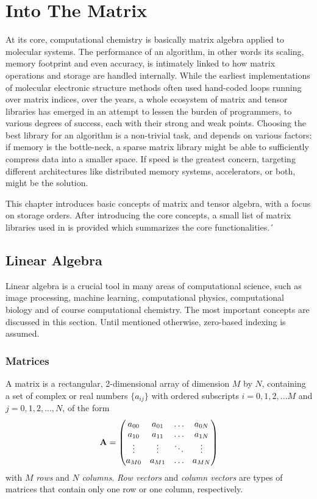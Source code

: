 \chapter{Into The Matrix}

At its core, computational chemistry is basically matrix algebra applied to molecular systems. The performance of an algorithm, in other words its scaling, memory footprint and even accuracy, is intimately linked to how matrix operations and storage are handled internally. While the earliest implementations of molecular electronic structure methods often used hand-coded loops running over matrix indices, over the years, a whole ecosystem of matrix and tensor libraries has emerged in an attempt to lessen the burden of programmers, to various degrees of success, each with their strong and weak points. Choosing the best library for an algorithm is a non-trivial task, and depends on various factors: if memory is the bottle-neck, a sparse matrix library might be able to sufficiently compress data into a smaller space. If speed is the greatest concern, targeting different architectures like distributed memory systems, accelerators, or both, might be the solution.

This chapter introduces basic concepts of matrix and tensor algebra, with a focus on storage orders. After introducing the core concepts, a small list of matrix libraries used in \mchem{} is provided which summarizes the core functionalities.´

\section{Linear Algebra}

Linear algebra is a crucial tool in many areas of computational science, such as image processing, machine learning, computational physics, computational biology and of course computational chemistry. The most important concepts are discussed in this section. Until mentioned otherwise, zero-based indexing is assumed. 

\subsection{Matrices}

A matrix is a rectangular, 2-dimensional array of dimension $M$ by $N$, containing a set of complex or real numbers $\{a_{ij}\}$ with ordered subscripts $i = 0,1,2,...M$ and $j = 0,1,2,...,N$, of the form
\begin{equation}
\mathbf{A} = \begin{pmatrix}
a_{00} & a_{01} & \ldots & a_{0N} \\
a_{10} & a_{11} & \ldots & a_{1N} \\
\vdots & \vdots & \ddots & \vdots \\
a_{M0} & a_{M1} & \ldots & a_{MN}
\end{pmatrix}
\end{equation}
\noindent with $M$ \emph{rows} and $N$ \emph{columns}. \emph{Row vectors} and \emph{column vectors} are types of matrices that contain only one row or one column, respectively. 

